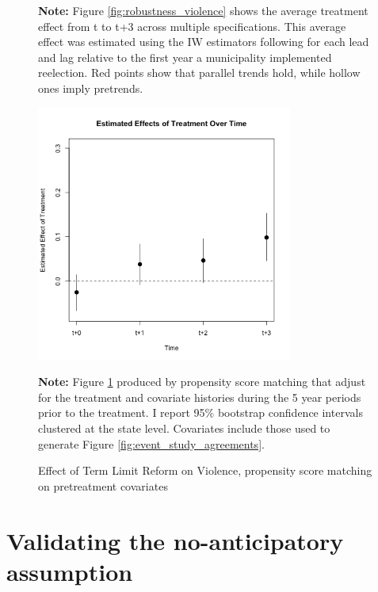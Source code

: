 \begin{appendix}
\begin{figure}[H]
 \textbf{Note:} Figure \ref{fig:robustness_violence} shows the average treatment effect from t to t+3 across multiple specifications. This average effect was estimated using the IW estimators following \citet{abraham_sun_2020} for each lead and lag relative to the first year a municipality implemented reelection. Red points show that parallel trends hold, while hollow ones imply pretrends. 
\end{figure}      

\begin{figure}[H] 
\centering
 \caption{Effect of Term Limit Reform on Violence, propensity score matching on pretreatment covariates}
 \label{fig:matching_violence}
\includegraphics[width=0.75\textwidth]{Figures/panelmatch_logdefuncionespc.png}
       \captionsetup{justification=centering}
    
        
 \textbf{Note:} Figure \ref{fig:matching_violence} produced by propensity score matching that adjust for the treatment and covariate histories during the 5 year periods prior to the treatment. I report 95\% bootstrap confidence intervals clustered at the state level. Covariates include those used to generate Figure \ref{fig:event_study_agreements}. 
 
\end{figure}   
           
    
    
 \clearpage   
 
\section{Validating the no-anticipatory assumption \label{appendix:CDLZ}}


\end{appendix}
